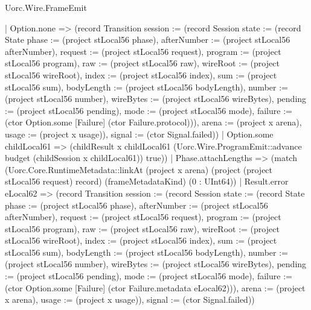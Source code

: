 \begin{lexlean}{Uorc.Wire.FrameEmit}
\begin{semanticmodule}
{          | Option.none => (record Transition {session := (record Session {state := (record State {phase := (project stLocal56 phase), afterNumber := (project stLocal56 afterNumber), request := (project stLocal56 request), program := (project stLocal56 program), raw := (project stLocal56 raw), wireRoot := (project stLocal56 wireRoot), index := (project stLocal56 index), sum := (project stLocal56 sum), bodyLength := (project stLocal56 bodyLength), number := (project stLocal56 number), wireBytes := (project stLocal56 wireBytes), pending := (project stLocal56 pending), mode := (project stLocal56 mode), failure := (ctor Option.some [Failure] (ctor Failure.protocol))}), arena := (project x arena), usage := (project x usage)}), signal := (ctor Signal.failed)})
          | Option.some childLocal61 => (childResult x childLocal61 (Uorc.Wire.ProgramEmit::advance budget (childSession x childLocal61)) true))
        | Phase.attachLengths => (match (Uorc.Core.RuntimeMetadata::linkAt (project x arena) (project (project stLocal56 request) record) (frameMetadataKind) (0 : UInt64))
          | Result.error eLocal62 => (record Transition {session := (record Session {state := (record State {phase := (project stLocal56 phase), afterNumber := (project stLocal56 afterNumber), request := (project stLocal56 request), program := (project stLocal56 program), raw := (project stLocal56 raw), wireRoot := (project stLocal56 wireRoot), index := (project stLocal56 index), sum := (project stLocal56 sum), bodyLength := (project stLocal56 bodyLength), number := (project stLocal56 number), wireBytes := (project stLocal56 wireBytes), pending := (project stLocal56 pending), mode := (project stLocal56 mode), failure := (ctor Option.some [Failure] (ctor Failure.metadata eLocal62))}), arena := (project x arena), usage := (project x usage)}), signal := (ctor Signal.failed)})
}
\end{semanticmodule}
\end{lexlean}

